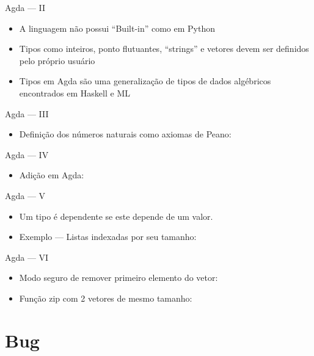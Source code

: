 \documentclass{beamer}
\begin{document}
 \begin{frame}{Agda --- II}
 \begin{itemize}
     \item A linguagem não possui \foreignquote{english}{Built-in} como em Python
     \item Tipos como inteiros, ponto flutuantes, \foreignquote{english}{strings} e vetores devem ser definidos pelo próprio usuário
     \item Tipos em Agda são uma generalização de tipos de dados algébricos encontrados em Haskell e ML
 \end{itemize}
 \end{frame}
 
 \begin{frame}{Agda --- III}
\begin{itemize}
  \item Definição dos números naturais como axiomas de Peano:
 \end{itemize}
\end{frame}

\begin{frame}{Agda --- IV}
 \begin{itemize}
   \item Adição em Agda:
 \end{itemize}
\end{frame}

\begin{frame}{Agda --- V}
 \begin{itemize}
   \item Um tipo é dependente se este depende de um valor.
   \item Exemplo --- Listas indexadas por seu tamanho:
 \end{itemize}
\end{frame}

\begin{frame}{Agda --- VI}
 \begin{itemize}
   \item Modo seguro de remover primeiro elemento do vetor:
   \item Função zip com 2 vetores de mesmo tamanho:
 \end{itemize}
\end{frame}

\section{Bug}
\end{document}
